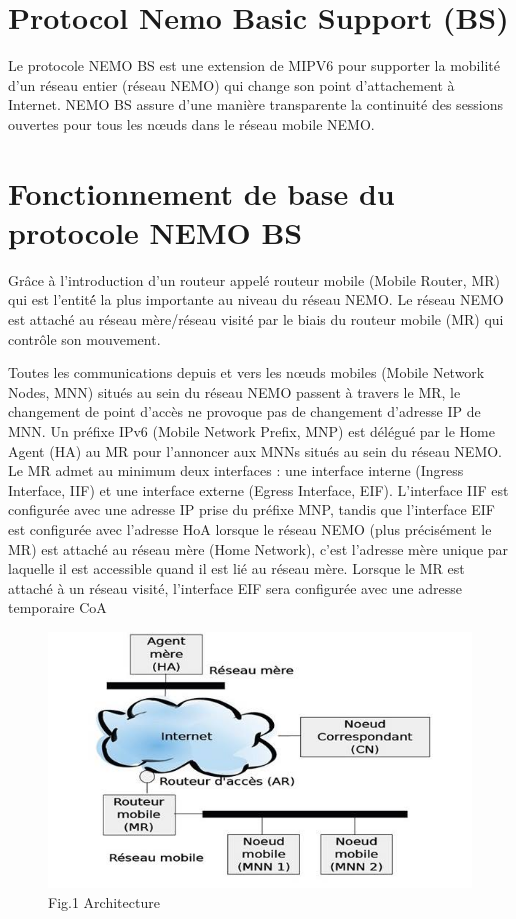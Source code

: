 \documentclass[12pt]{article}
\begin{document}
\section{Protocol Nemo  Basic Support (BS)}
Le protocole NEMO BS est une extension de MIPV6 pour supporter la mobilit\'e d'un r\'eseau entier (r\'eseau NEMO) qui change son point d'attachement \`a Internet. NEMO BS  assure d'une mani\`ere transparente la continuit\'e des sessions ouvertes pour tous les nœuds dans le r\'eseau mobile NEMO.

\newpage
\section{Fonctionnement  de base du protocole NEMO BS}

Gr\^ace \`a l'introduction d'un routeur appel\'e routeur mobile (Mobile Router, MR) qui est l'entit\'é la plus importante  au niveau du r\'eseau NEMO.
 Le réseau NEMO est attach\'e au r\'eseau m\`ere/r\'eseau visit\'e par le biais du routeur mobile (MR) qui contr\^ole son mouvement. 

Toutes les communications depuis et vers les nœuds mobiles (Mobile Network Nodes, MNN) situés au sein du r\'eseau NEMO passent \`a travers le MR, le changement de point d'acc\`es ne provoque pas de changement d'adresse IP de MNN.
 Un pr\'efixe IPv6 (Mobile Network Prefix, MNP) est d\'el\'egu\'e par le Home Agent (HA) au MR pour l’annoncer aux MNNs situ\'es au sein du r\'eseau NEMO.
Le MR admet au minimum deux interfaces : une interface interne (Ingress Interface,  IIF) et une interface externe (Egress Interface,  EIF). L'interface IIF est configur\'ee avec une adresse IP prise du pr\'efixe MNP, tandis que l'interface EIF est configur\'ee avec l'adresse HoA lorsque le r\'eseau NEMO (plus pr\'ecis\'ement le MR) est attach\'e au r\'eseau m\`ere (Home Network), c'est l'adresse m\`ere unique par laquelle il est accessible quand il est li\'e au r\'eseau m\`ere. Lorsque le MR est attach\'e \`a un r\'eseau visit\'e, l'interface EIF sera configur\'ee avec une adresse temporaire CoA

\begin{figure}[h]
\begin{center}
\includegraphics[scale=0.7]{img8.png}
\caption[9pt]{Fig.1 Architecture}
\end{center}
\end{figure}
\end{document}
